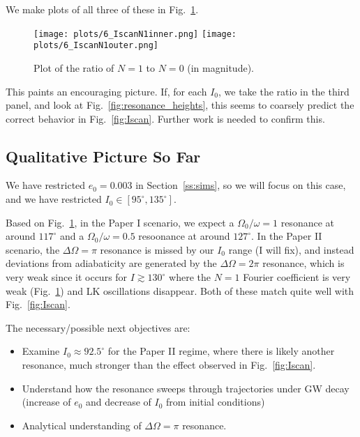\documentclass[11pt,
        usenames, %
        dvipsnames %
    ]{article}
\begin{document}
We make plots of all three of these in Fig.~\ref{fig:IscanN1}.
\begin{figure}
    \centering
    \texttt{[image: plots/6\_IscanN1inner.png]}
    \texttt{[image: plots/6\_IscanN1outer.png]}
    \caption{Plot of the ratio of $N = 1$ to $N = 0$ (in magnitude).}\label{fig:IscanN1}
\end{figure}

This paints an encouraging picture. If, for each $I_0$, we take the ratio in the
third panel, and look at Fig.~\ref{fig:resonance_heights}, this seems to
coarsely predict the correct behavior in Fig.~\ref{fig:Iscan}. Further work is
needed to confirm this.

\subsection{Qualitative Picture So Far}

We have restricted $e_0 = 0.003$ in Section~\ref{ss:sims}, so we will focus on
this case, and we have restricted $I_0 \in [95^\circ, 135^\circ]$.

Based on Fig.~\ref{fig:IscanN1}, in the Paper I scenario, we expect a
$\Omega_0/\omega = 1$ resonance at around $117^\circ$ and a $\Omega_0/\omega =
0.5$ resoonance at around $127^\circ$. In the Paper II scenario, the
$\Delta \Omega = \pi$ resonance is missed by our $I_0$ range (I will fix), and
instead deviations from adiabaticity are generated by the $\Delta \Omega = 2\pi$
resonance, which is very weak since it occurs for $I \gtrsim 130^\circ$ where
the $N = 1$ Fourier coefficient is very weak (Fig.~\ref{fig:IscanN1}) and LK
oscillations disappear. Both of these match quite well with
Fig.~\ref{fig:Iscan}.

The necessary/possible next objectives are:
\begin{itemize}
    \item Examine $I_0 \approx 92.5^\circ$ for the Paper II regime, where there
        is likely another resonance, much stronger than the effect observed in
        Fig.~\ref{fig:Iscan}.
    \item Understand how the resonance sweeps through trajectories under GW
        decay (increase of $e_0$ and decrease of $I_0$ from initial conditions)
    \item Analytical understanding of $\Delta \Omega = \pi$ resonance.
\end{itemize}
\end{document}
